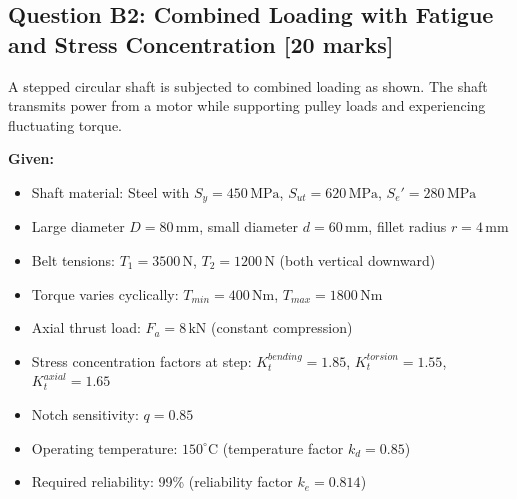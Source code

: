 \documentclass[12pt,a4paper]{article}
\begin{document}
\begin{questionbox}
\subsection*{Question B2: Combined Loading with Fatigue and Stress Concentration [20 marks]}

A stepped circular shaft is subjected to combined loading as shown. The shaft transmits power 
from a motor while supporting pulley loads and experiencing fluctuating torque.

\textbf{Given:}
\begin{itemize}
    \item Shaft material: Steel with $S_y = 450\,\text{MPa}$, $S_{ut} = 620\,\text{MPa}$, $S_e' = 280\,\text{MPa}$
    \item Large diameter $D = 80\,\text{mm}$, small diameter $d = 60\,\text{mm}$, fillet radius $r = 4\,\text{mm}$
    \item Belt tensions: $T_1 = 3500\,\text{N}$, $T_2 = 1200\,\text{N}$ (both vertical downward)
    \item Torque varies cyclically: $T_{min} = 400\,\text{Nm}$, $T_{max} = 1800\,\text{Nm}$
    \item Axial thrust load: $F_a = 8\,\text{kN}$ (constant compression)
    \item Stress concentration factors at step: $K_t^{bending} = 1.85$, $K_t^{torsion} = 1.55$, $K_t^{axial} = 1.65$
    \item Notch sensitivity: $q = 0.85$
    \item Operating temperature: $150^\circ\text{C}$ (temperature factor $k_d = 0.85$)
    \item Required reliability: 99\% (reliability factor $k_e = 0.814$)
\end{itemize}

\begin{center}
\end{center}
\end{questionbox}
\end{document}
